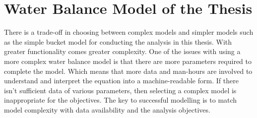 \section{Water Balance Model of the Thesis}\label{section:waterbalancethesis}
There is a trade-off in choosing between complex models and simpler models such as the simple bucket model for conducting the analysis in this thesis. With greater functionality comes greater complexity. One of the issues with using a more complex water balance model is that there are more parameters required to complete the model. Which means that more data and man-hours are involved to understand and interpret the equation into a machine-readable form. If there isn't sufficient data of various parameters, then selecting a complex model is inappropriate for the objectives. The key to successful modelling is to match model complexity with data availability and the analysis objectives.
